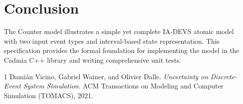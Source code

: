 \section{Conclusion}

The Counter model illustrates a simple yet complete IA-DEVS atomic model with two input event types and interval-based state representation. This specification provides the formal foundation for implementing the model in the Cadmia C++ library and writing comprehensive unit tests.

\begin{thebibliography}{1}
Damián Vicino, Gabriel Wainer, and Olivier Dalle.
\textit{Uncertainty on Discrete-Event System Simulation}.
ACM Transactions on Modeling and Computer Simulation (TOMACS), 2021.
\end{thebibliography}
